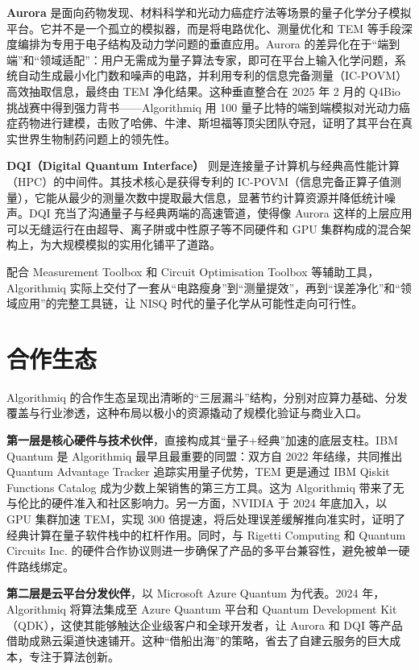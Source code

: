 \documentclass[11pt,a4paper]{ctexart}
\begin{document}
\textbf{Aurora} 是面向药物发现、材料科学和光动力癌症疗法等场景的量子化学分子模拟平台。它并不是一个孤立的模拟器，而是将电路优化、测量优化和 TEM 等手段深度编排为专用于电子结构及动力学问题的垂直应用。Aurora 的差异化在于“端到端”和“领域适配”：用户无需成为量子算法专家，即可在平台上输入化学问题，系统自动生成最小化门数和噪声的电路，并利用专利的信息完备测量（IC-POVM）高效抽取信息，最终由 TEM 净化结果。这种垂直整合在 2025 年 2 月的 Q4Bio 挑战赛中得到强力背书——Algorithmiq 用 100 量子比特的端到端模拟对光动力癌症药物进行建模，击败了哈佛、牛津、斯坦福等顶尖团队夺冠，证明了其平台在真实世界生物制药问题上的领先性。

\textbf{DQI（Digital Quantum Interface）} 则是连接量子计算机与经典高性能计算（HPC）的中间件。其技术核心是获得专利的 IC-POVM（信息完备正算子值测量），它能从最少的测量次数中提取最大信息，显著节约计算资源并降低统计噪声。DQI 充当了沟通量子与经典两端的高速管道，使得像 Aurora 这样的上层应用可以无缝运行在由超导、离子阱或中性原子等不同硬件和 GPU 集群构成的混合架构上，为大规模模拟的实用化铺平了道路。

配合 Measurement Toolbox 和 Circuit Optimisation Toolbox 等辅助工具，Algorithmiq 实际上交付了一套从“电路瘦身”到“测量提效”，再到“误差净化”和“领域应用”的完整工具链，让 NISQ 时代的量子化学从可能性走向可行性。

\section{合作生态}
Algorithmiq 的合作生态呈现出清晰的“三层漏斗”结构，分别对应算力基础、分发覆盖与行业渗透，这种布局以极小的资源撬动了规模化验证与商业入口。

\textbf{第一层是核心硬件与技术伙伴}，直接构成其“量子+经典”加速的底层支柱。IBM Quantum 是 Algorithmiq 最早且最重要的同盟：双方自 2022 年结缘，共同推出 Quantum Advantage Tracker 追踪实用量子优势，TEM 更是通过 IBM Qiskit Functions Catalog 成为少数上架销售的第三方工具。这为 Algorithmiq 带来了无与伦比的硬件准入和社区影响力。另一方面，NVIDIA 于 2024 年底加入，以 GPU 集群加速 TEM，实现 300 倍提速，将后处理误差缓解推向准实时，证明了经典计算在量子软件栈中的杠杆作用。同时，与 Rigetti Computing 和 Quantum Circuits Inc. 的硬件合作协议则进一步确保了产品的多平台兼容性，避免被单一硬件路线绑定。

\textbf{第二层是云平台分发伙伴}，以 Microsoft Azure Quantum 为代表。2024 年，Algorithmiq 将算法集成至 Azure Quantum 平台和 Quantum Development Kit（QDK），这使其能够触达企业级客户和全球开发者，让 Aurora 和 DQI 等产品借助成熟云渠道快速铺开。这种“借船出海”的策略，省去了自建云服务的巨大成本，专注于算法创新。
\end{document}

